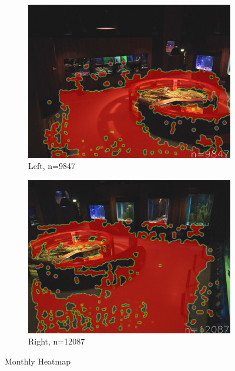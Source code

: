 \begin{figure}[H]
    \centering
    \begin{subfigure}{0.475\textwidth}
        \centering
        \includegraphics[width=\textwidth]{Images/Analytics/heatmap_left_all.jpg}
        \caption{Left, n=9847}
    \end{subfigure}
    \hfill
    \begin{subfigure}{0.475\textwidth}
        \centering
        \includegraphics[width=\textwidth]{Images/Analytics/heatmap_right_all.jpg}
        \caption{Right, n=12087}
    \end{subfigure}
    \caption{Monthly Heatmap}
    \label{fig:heatmap_month}
\end{figure}

